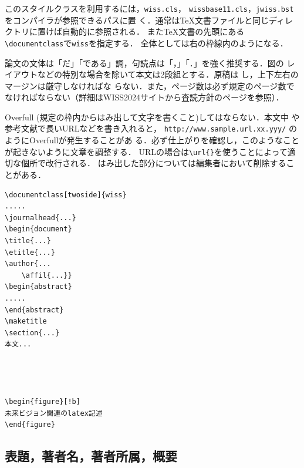 \documentclass[twoside]{wiss}
\begin{document}
このスタイルクラスを利用するには，\verb|wiss.cls|，
\verb|wissbase11.cls|，\verb|jwiss.bst|をコンパイラが参照できるパスに置
く．通常は\TeX 文書ファイルと同じディレクトリに置けば自動的に参照される．
また\TeX 文書の先頭にある\verb|\documentclass|で\verb|wiss|を指定する．
全体としては右の枠線内のようになる．

論文の文体は「だ」「である」調，句読点は「，」「．」を強く推奨する．図の
レイアウトなどの特別な場合を除いて本文は2段組とする．原稿は
し，上下左右のマージンは厳守しなければな
らない．また，ページ数は必ず規定のページ数でなければならない（詳細はWISS2024サイトから査読方針のページを参照）．

Overfull (規定の枠内からはみ出して文字を書くこと)してはならない．本文中
や参考文献で長いURLなどを書き入れると，
\verb|http://www.sample.url.xx.yyy/| のようにOverfullが発生することがあ
る．必ず仕上がりを確認し，このようなことが起きないように文章を調整する．
URLの場合は\verb|\url{}|を使うことによって適切な個所で改行される．
はみ出した部分については編集者において削除することがある．

\begin{screen}
\begin{verbatim}
\documentclass[twoside]{wiss}
.....
\journalhead{...}
\begin{document}
\title{...}
\etitle{...}
\author{...
    \affil{...}}
\begin{abstract}
.....
\end{abstract}
\maketitle
\section{...}
本文...




\begin{figure}[!b]
未来ビジョン関連のlatex記述
\end{figure}
\end{verbatim}
\end{screen}


\subsection{表題，著者名，著者所属，概要}
\end{document}

